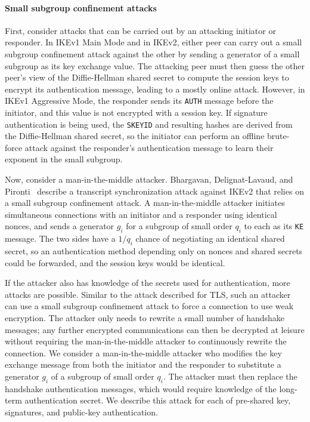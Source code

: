 \paragraph{Small subgroup confinement attacks} First, consider attacks that can
be carried out by an attacking initiator or responder. In IKEv1 Main Mode and
in IKEv2, either peer can carry out a small subgroup confinement attack against
the other by sending a generator of a small subgroup as its key exchange value.
The attacking peer must then guess the other peer's view of the Diffie-Hellman
shared secret to compute the session keys to encrypt its authentication
message, leading to a mostly online attack. However, in IKEv1 Aggressive Mode,
the responder sends its \texttt{AUTH} message before the initiator, and this
value is not encrypted with a session key. If signature authentication is being
used, the \texttt{SKEYID} and resulting hashes are derived from the
Diffie-Hellman shared secret, so the initiator can perform an offline
brute-force attack against the responder's authentication message to learn
their exponent in the small subgroup.

Now, consider a man-in-the-middle attacker. Bhargavan, Delignat-Lavaud, and
Pironti~\cite{conf/ndss/BhargavanDP15} describe a transcript synchronization
attack against IKEv2 that relies on a small subgroup confinement attack.  A
man-in-the-middle attacker initiates simultaneous connections with an initiator
and a responder using identical nonces, and sends a generator $g_i$ for a
subgroup of small order $q_i$ to each as its \texttt{KE} message.  The two
sides have a $1/q_i$ chance of negotiating an identical shared secret, so an
authentication method depending only on nonces and shared secrets could be
forwarded, and the session keys would be identical.

If the attacker also has knowledge of the secrets used for authentication, more
attacks are possible.  Similar to the attack described for TLS, such an
attacker can use a small subgroup confinement attack to force a connection to
use weak encryption. The attacker only needs to rewrite a small number of
handshake messages; any further encrypted communications can then be decrypted
at leisure without requiring the man-in-the-middle attacker to continuously
rewrite the connection. We consider a man-in-the-middle attacker who modifies
the key exchange message from both the initiator and the responder to
substitute a generator $g_i$ of a subgroup of small order $q_i$.  The attacker
must then replace the handshake authentication messages, which would require
knowledge of the long-term authentication secret.  We describe this attack for
each of pre-shared key, signatures, and public-key authentication. 

